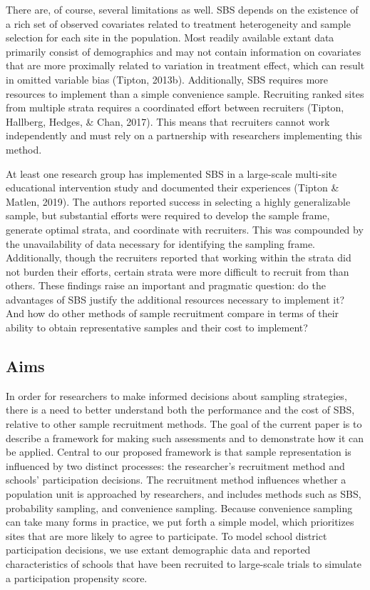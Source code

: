 \documentclass[
  english,
  man,floatsintext]{apa6}
\begin{document}
There are, of course, several limitations as well. SBS depends on the existence of a rich set of observed covariates related to treatment heterogeneity and sample selection for each site in the population. Most readily available extant data primarily consist of demographics and may not contain information on covariates that are more proximally related to variation in treatment effect, which can result in omitted variable bias (Tipton, 2013b). Additionally, SBS requires more resources to implement than a simple convenience sample. Recruiting ranked sites from multiple strata requires a coordinated effort between recruiters (Tipton, Hallberg, Hedges, \& Chan, 2017). This means that recruiters cannot work independently and must rely on a partnership with researchers implementing this method.

At least one research group has implemented SBS in a large-scale multi-site educational intervention study and documented their experiences (Tipton \& Matlen, 2019). The authors reported success in selecting a highly generalizable sample, but substantial efforts were required to develop the sample frame, generate optimal strata, and coordinate with recruiters.
This was compounded by the unavailability of data necessary for identifying the sampling frame.
Additionally, though the recruiters reported that working within the strata did not burden their efforts, certain strata were more difficult to recruit from than others.
These findings raise an important and pragmatic question: do the advantages of SBS justify the additional resources necessary to implement it?
And how do other methods of sample recruitment compare in terms of their ability to obtain representative samples and their cost to implement?

\hypertarget{aims}{%
\subsection{Aims}\label{aims}}

In order for researchers to make informed decisions about sampling strategies, there is a need to better understand both the performance and the cost of SBS, relative to other sample recruitment methods.
The goal of the current paper is to describe a framework for making such assessments and to demonstrate how it can be applied.
Central to our proposed framework is that sample representation is influenced by two distinct processes: the researcher's recruitment method and schools' participation decisions.
The recruitment method influences whether a population unit is approached by researchers, and includes methods such as SBS, probability sampling, and convenience sampling.
Because convenience sampling can take many forms in practice, we put forth a simple model, which prioritizes sites that are more likely to agree to participate.
To model school district participation decisions, we use extant demographic data and reported characteristics of schools that have been recruited to large-scale trials to simulate a participation propensity score.
\end{document}

